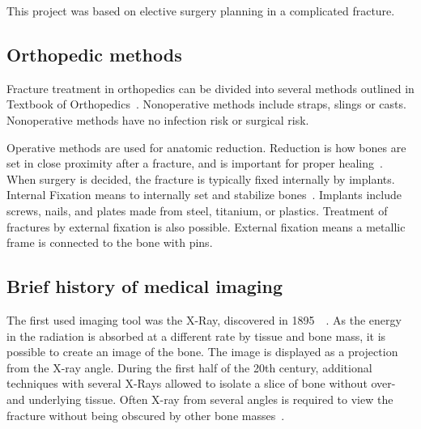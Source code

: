 \documentclass[a4paper]{report}
\begin{document}
This project was based on elective surgery planning in a complicated fracture.

\subsection{Orthopedic methods}

Fracture treatment in orthopedics can be divided into several methods outlined in Textbook of Orthopedics~\cite{ebnezar_textbook_2016}.
Nonoperative methods include straps, slings or casts.
Nonoperative methods have no infection risk or surgical risk.

Operative methods are used for anatomic reduction. Reduction is how bones are set in close proximity after a fracture, and is important for proper healing~\cite{verywell}.
When surgery is decided, the fracture is typically fixed internally by implants.
Internal Fixation means to internally set and stabilize bones~\cite{ebnezar_textbook_2016}.
Implants include screws, nails, and plates made from steel, titanium, or plastics.
Treatment of fractures by external fixation is also possible. External fixation means a metallic frame is connected to the bone with pins.

\subsection{Brief history of medical imaging}
The first used imaging tool was the X-Ray, discovered in 1895~\cite{hamblen_outline_2010}~\cite{suetens_fundamentals_2017}. As the energy in the radiation is absorbed at a different rate by tissue and bone mass, it is possible to create an image of the bone. The image is displayed as a projection from the X-ray angle. During the first half of the 20th century, additional techniques with several X-Rays allowed to isolate a slice of bone without over- and underlying tissue. Often X-ray from several angles is required to view the fracture without being obscured by other bone masses~\cite{ebnezar_textbook_2016}.
\end{document}
